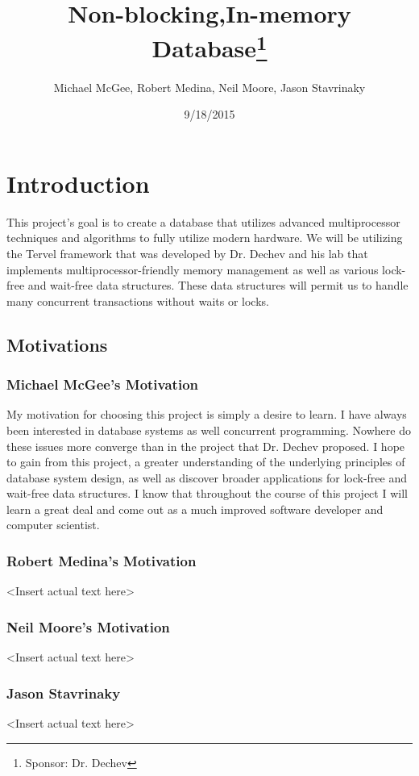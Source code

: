 \documentclass[letterpaper]{article}
\title{Non-blocking,In-memory Database\thanks{Sponsor: Dr. Dechev}}
\author{Michael McGee, Robert Medina, Neil Moore, Jason Stavrinaky}
\date{9/18/2015}
\begin{document}
  \maketitle
  \newpage

  \section{Introduction}
  This project's goal is to create a database that utilizes advanced multiprocessor techniques and algorithms to fully utilize modern hardware.
  We will be utilizing the Tervel framework that was developed by Dr. Dechev and his lab that implements multiprocessor-friendly memory management
  as well as various lock-free and wait-free data structures. These data structures will permit us to handle many concurrent transactions without 
  waits or locks.
  
  \subsection{Motivations}
  \subsubsection{Michael McGee's Motivation}
  My motivation for choosing this project is simply a desire to learn. I have always been interested in database systems as well concurrent programming. Nowhere do these issues more converge than in the project that Dr. Dechev proposed.  
  I hope to gain from this project, a greater understanding of the underlying principles of database system design, as well as discover broader applications for lock-free and wait-free data structures. I know that throughout the course of this project I will learn a great deal and come out as a much improved software developer and computer scientist.  
  \subsubsection{Robert Medina's Motivation}
  \textless Insert actual text here\textgreater
  \subsubsection{Neil Moore's Motivation}
  \textless Insert actual text here\textgreater
  \subsubsection{Jason Stavrinaky}
  \textless Insert actual text here\textgreater
  
\end{document}
